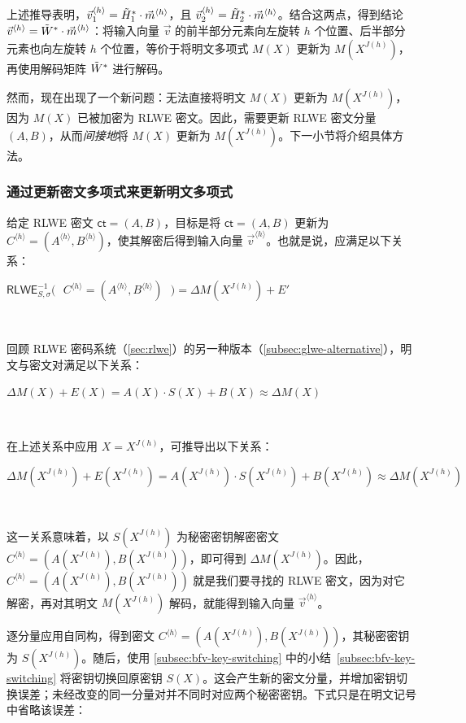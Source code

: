 上述推导表明，$\vec{v}_1^{\langle h \rangle} = \tilde{H}_1^{*}\cdot \vec{m}^{\langle h \rangle}$，且 $\vec{v}_2^{\langle h \rangle} = \tilde{H}_2^{*}\cdot \vec{m}^{\langle h \rangle}$。结合这两点，得到结论 $\vec{v}^{\langle h \rangle} = \tilde{W}^* \cdot \vec{m}^{\langle h \rangle}$：将输入向量 $\vec{v}$ 的前半部分元素向左旋转 $h$ 个位置、后半部分元素也向左旋转 $h$ 个位置，等价于将明文多项式 $M(X)$ 更新为 $M(X^{J(h)})$，再使用解码矩阵 $\tilde{W}^*$ 进行解码。



然而，现在出现了一个新问题：无法直接将明文 $M(X)$ 更新为 $M(X^{J(h)})$，因为 $M(X)$ 已被加密为 RLWE 密文。因此，需要更新 RLWE 密文分量 $(A, B)$，从而\textit{间接地}将 $M(X)$ 更新为 $M(X^{J(h)})$。下一小节将介绍具体方法。


\subsubsection{通过更新密文多项式来更新明文多项式}

给定 RLWE 密文 $\textsf{ct} = (A, B)$，目标是将 $\textsf{ct} = (A, B)$ 更新为 $C^{\langle h \rangle} = (A^{\langle h \rangle}, B^{\langle h \rangle})$，使其解密后得到输入向量 $\vec{v}^{\langle h \rangle}$。也就是说，应满足以下关系：

$\textsf{RLWE}^{-1}_{S, \sigma}\bm{(} \text{ } C^{\langle h \rangle} = (A^{\langle h \rangle}, B^{\langle h \rangle}) \text{ }\bm{)} = \Delta M(X^{J(h)}) + E'$

$ $

回顾 RLWE 密码系统（\autoref{sec:rlwe}）的另一种版本（\autoref{subsec:glwe-alternative}），明文与密文对满足以下关系：

$\Delta M(X) + E(X) = A(X)\cdot S(X) + B(X) \approx \Delta M(X)$

$ $

在上述关系中应用 $X = X^{J(h)}$，可推导出以下关系：

$\Delta M(X^{J(h)}) + E(X^{J(h)}) = A(X^{J(h)}) \cdot S(X^{J(h)}) + B(X^{J(h)}) \approx \Delta M(X^{J(h)})$

$ $

这一关系意味着，以 $S(X^{J(h)})$ 为秘密密钥解密密文 $C^{\langle h \rangle} = (A(X^{J(h)}), B(X^{J(h)}))$，即可得到 $\Delta M(X^{J(h)})$。因此，$C^{\langle h \rangle} = (A(X^{J(h)}), B(X^{J(h)}))$ 就是我们要寻找的 RLWE 密文，因为对它解密，再对其明文 $M(X^{J(h)})$ 解码，就能得到输入向量 $\vec{v}^{\langle h \rangle}$。

逐分量应用自同构，得到密文 $C^{\langle h\rangle}=(A(X^{J(h)}),B(X^{J(h)}))$，其秘密密钥为 $S(X^{J(h)})$。随后，使用 \autoref{subsec:bfv-key-switching} 中的小结~\ref*{subsec:bfv-key-switching} 将密钥切换回原密钥 $S(X)$。这会产生新的密文分量，并增加密钥切换误差；未经改变的同一分量对并不同时对应两个秘密密钥。下式只是在明文记号中省略该误差：


